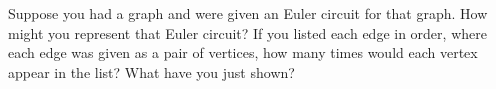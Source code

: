 \documentclass{book}
\begin{document}
\setcounter{project}{17}
\addtocounter{project}{-1}
\begin{activity}[]\label{activity-12}
\hypertarget{p-195}{}%
Suppose you had a graph and were given an Euler circuit for that graph.  How might you represent that Euler circuit?  If you listed each edge in order, where each edge was given as a pair of vertices, how many times would each vertex appear in the list?  What have you just shown?%
\end{activity}
\end{document}
